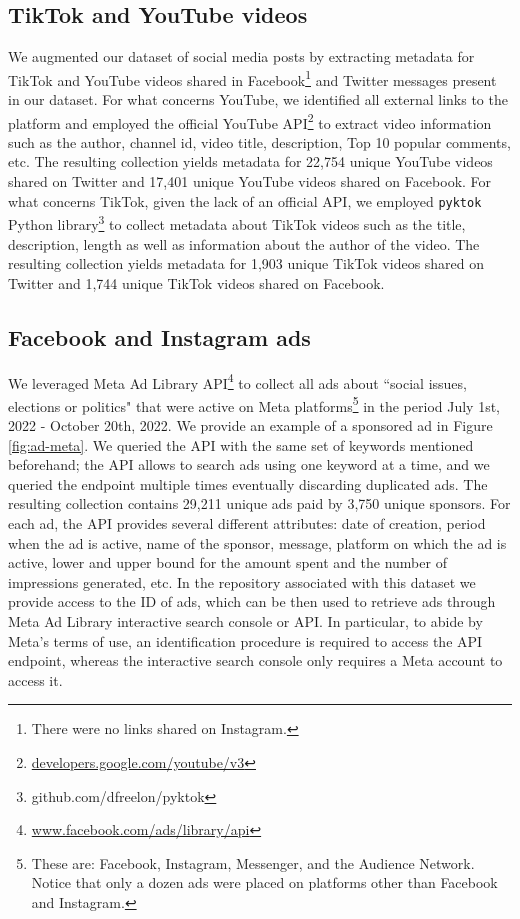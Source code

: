 \documentclass[letterpaper]{article} %
\begin{document}
\subsection{TikTok and YouTube videos}

We augmented our dataset of social media posts by extracting metadata for TikTok and YouTube videos shared in Facebook\footnote{There were no links shared on Instagram.} and Twitter messages present in our dataset. For what concerns YouTube, we identified all external links to the platform and employed the official YouTube API\footnote{\url{developers.google.com/youtube/v3}} to extract video information such as the author, channel id, video title, description, Top 10 popular comments, etc. The resulting collection yields metadata for 22,754 unique YouTube videos shared on Twitter and 17,401 unique YouTube videos shared on Facebook. For what concerns TikTok, given the lack of an official API, we employed \texttt{pyktok} Python library\footnote{github.com/dfreelon/pyktok} to collect metadata about TikTok videos such as the title, description, length as well as information about the author of the video.
The resulting collection yields metadata for 1,903 unique TikTok videos shared on Twitter and 1,744 unique TikTok videos shared on Facebook.

\subsection{Facebook and Instagram ads}

We leveraged Meta Ad Library API\footnote{\url{www.facebook.com/ads/library/api}} to collect all ads about ``social issues, elections or politics" that were active on Meta platforms\footnote{These are: Facebook, Instagram, Messenger, and the Audience Network. Notice that only a dozen ads were placed on platforms other than Facebook and Instagram.} in the period July 1st, 2022 - October 20th, 2022. We provide an example of a sponsored ad in Figure \ref{fig:ad-meta}. We queried the API with the same set of keywords mentioned beforehand; the API allows to search ads using one keyword at a time, and we queried the endpoint multiple times eventually discarding duplicated ads. The resulting collection contains 29,211 unique ads paid by 3,750 unique sponsors. For each ad, the API provides several different attributes: date of creation, period when the ad is active, name of the sponsor, message, platform on which the ad is active, lower and upper bound for the amount spent and the number of impressions generated, etc. In the repository associated with this dataset we provide access to the ID of ads, which can be then used to retrieve ads through Meta Ad Library interactive search console or API. In particular, to abide by Meta's terms of use, an identification procedure is required to access the API endpoint, whereas the interactive search console only requires a Meta account to access it.
\end{document}
